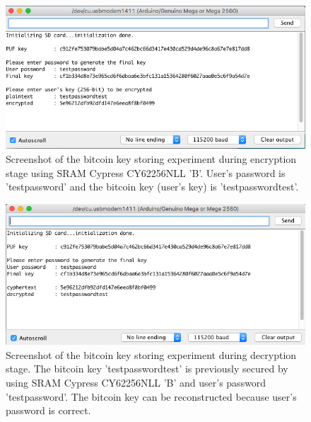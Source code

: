 \begin{figure}[tph!]
    \centerline{\includegraphics[width={\textwidth}]{images/B_encrypt}}
    \caption{Screenshot of the bitcoin key storing experiment during encryption stage using SRAM Cypress CY62256NLL 'B'.
    User's password is 'testpassword' and the bitcoin key (user's key) is 'testpasswordtest'.}
    \label{fig:B_encrypt}
\end{figure}

\begin{figure}[tph!]
    \centerline{\includegraphics[width={\textwidth}]{images/B_decrypt_correct}}
    \caption{Screenshot of the bitcoin key storing experiment during decryption stage. The bitcoin key 'testpasswordtest' is previously secured by using SRAM Cypress CY62256NLL 'B' and user's password 'testpassword'.
    The bitcoin key can be reconstructed because user's password is correct.}
    \label{fig:B_decrypt_correct}
\end{figure}

